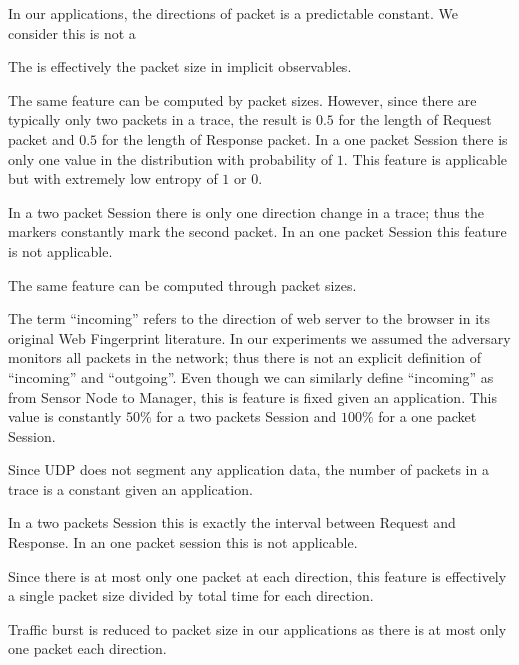 \begin{description}[style=nextline]
	\item[Direction]
	In our applications, the directions of packet is a predictable constant. We consider this is not a 
	
	\item[Length]
	The is effectively the packet size in implicit observables.
	
	\item[Frequency Distribution of Length]
	The same feature can be computed by packet sizes. However, since there are typically only two packets in a trace, the result is $0.5$ for the length of Request packet and $0.5$ for the length of Response packet. In a one packet Session there is only one value in the distribution with probability of $1$. This feature is applicable but with extremely low entropy of $1$ or $0$.
	
	\item[Size, HTML and Number Markers]
	In a two packet Session there is only one direction change in a trace; thus the markers constantly mark the second packet. In an one packet Session this feature is not applicable.
	
	\item[Total Bytes]
	The same feature can be computed through packet sizes.
	
	\item[Percentage Incoming Packets]
	The term ``incoming'' refers to the direction of web server to the browser in its original Web Fingerprint literature. In our experiments we assumed the adversary monitors all packets in the network; thus there is not an explicit definition of ``incoming'' and ``outgoing''. Even though we can similarly define ``incoming'' as from Sensor Node to Manager, this is feature is fixed given an application. This value is constantly $50\%$ for a two packets Session and $100\%$ for a one packet Session.
	
	\item[Number of Packets]
	Since UDP does not segment any application data, the number of packets in a trace is a constant given an application. 
	
	\item[Total Time]
	In a two packets Session this is exactly the interval between Request and Response. In an one packet session this is not applicable.
	
	\item[Total Per-direction Bandwidth]
	Since there is at most only one packet at each direction, this feature is effectively a single packet size divided by total time for each direction.
	
	\item[Traffic Burst]
	Traffic burst is reduced to packet size in our applications as there is at most only one packet each direction.
\end{description}

